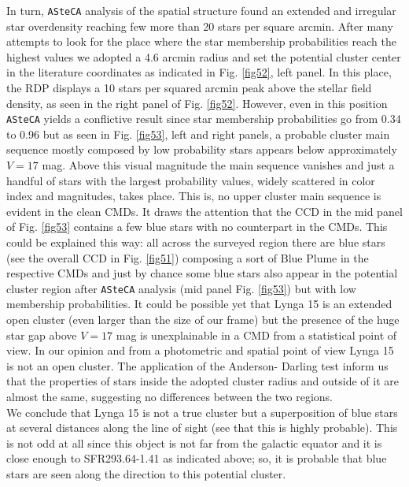 \documentclass{aa}
\begin{document}
In turn, \texttt{ASteCA} analysis of the spatial structure found an extended and
irregular star overdensity reaching few more than 20 stars per square arcmin.
After many attempts to look for the place where the star membership
probabilities reach the highest values we adopted a 4.6 arcmin radius and set
the potential cluster center in the literature coordinates as indicated in Fig.
\ref{fig52}, left panel. In this place, the RDP displays a 10 stars per squared
arcmin peak above the stellar field density, as seen in the right panel of Fig. 
\ref{fig52}. However, even in this position \texttt{ASteCA} yields a
conflictive result since star membership
probabilities go from 0.34 to 0.96 but as seen in Fig. \ref{fig53}, left and
right panels, a probable cluster main sequence mostly composed by low
probability stars appears below approximately $V = 17$ mag. Above this visual
magnitude the main sequence vanishes and just a handful of stars with the
largest probability values, widely scattered in color index and magnitudes,
takes place. This is, no upper cluster main sequence is evident in the clean
CMDs. It draws the attention that the CCD in the mid panel of Fig. \ref{fig53}
contains a few blue stars with no counterpart in the CMDs. This could be
explained this way: all across the surveyed region there are blue stars (see the
overall CCD in Fig. \ref{fig51}) composing a sort of Blue Plume in the
respective CMDs and just by chance some blue stars also appear in the potential
cluster region after \texttt{ASteCA} analysis (mid panel Fig. \ref{fig53}) but
with low membership probabilities. It could be possible yet that Lynga 15 is an
extended open cluster (even larger than the size of our frame) but the presence
of the huge star gap above $V = 17$ mag is unexplainable in a CMD from a
statistical point of view. In our opinion and from a photometric and spatial
point of view Lynga 15 is not an open cluster. The application of the Anderson-
Darling test inform us that the properties of stars inside the adopted cluster
radius and outside of it are almost the same, suggesting no differences between
the two regions.\\

We conclude that Lynga 15 is not a true cluster but a superposition of blue
stars at several distances along the line of sight (see that this is highly
probable). This is not odd at all since this object is not
far from the galactic equator and it is close enough to SFR293.64-1.41 as
indicated above; so, it is probable that blue stars are seen along the direction
to this potential cluster.
\end{document}
